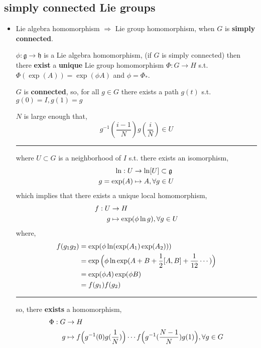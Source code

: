 \subsection{simply connected Lie groups} \label{5.1.1}
\begin{itemize}
	\item Lie algebra homomorphism $\Longrightarrow$ Lie group homomorphism, when $G$ is \textbf{simply connected}.
	
	$\phi : \mathfrak{g} \rightarrow \mathfrak{h}$ is a Lie algebra homomorphism, (if $G$ is simply connected) then there \textbf{exist} a \textbf{unique} Lie group homomorphism $\Phi : G \rightarrow H$ s.t. $\Phi(\exp(A)) = \exp(\phi A)$ and $\phi = \Phi_*$.
	
	\begin{tcolorbox}[title=proof:]
		$G$ is \textbf{connected}, so, for all $g \in G$ there exists a path $g(t)$ s.t. $g(0) = I, g(1) = g$
		
		$N$ is large enough that,
		\begin{equation}
			g^{- 1}(\frac{i - 1}{N}) g(\frac{i}{N}) \in U
		\end{equation}
		
		\noindent\rule[0.5ex]{\linewidth}{0.5pt} %
		
		where $U \subset G$ is a neighborhood of $I$ s.t. there exists an isomorphism,
		\begin{align}
			\ln : U & \rightarrow \ln[U] \subset \mathfrak{g} \notag \\
			g = \exp(A) & \mapsto A, \forall g \in U
		\end{align}
		which implies that there exists a unique local homomorphism,
		\begin{align}
			f : U & \rightarrow H \notag \\
			g & \mapsto \exp(\phi \ln g), \forall g \in U
		\end{align}
		where,
		\begin{align}
			f(g_1 g_2) &= \exp(\phi \ln(\exp(A_1) \exp(A_2))) \notag \\
			&= \exp \Big(\phi \ln \exp( A + B + \frac{1}{2} [A, B] + \frac{1}{12} \cdots) \Big) \notag \\
			&= \exp(\phi A) \exp(\phi B) \notag \\
			&= f(g_1) f(g_2)
		\end{align}
		
		\noindent\rule[0.5ex]{\linewidth}{0.5pt} %
		
		so, there \textbf{exists} a homomorphism,
		\begin{align}
			\Phi : G & \rightarrow H \notag \\
			g & \mapsto f \Big( g^{- 1}(0) g(\frac{1}{N}) \Big) \cdots f \Big( g^{- 1}(\frac{N - 1}{N}) g(1) \Big), \forall g \in G
		\end{align}
		

\end{tcolorbox}
\end{itemize}
